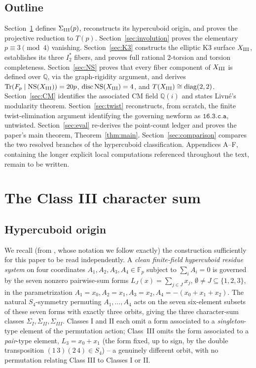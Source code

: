 \documentclass[11pt]{amsart}
\theoremstyle{definition}
\newcommand{\Fp}{\mathbb{F}_p}
\newcommand{\Q}{\mathbb{Q}}
\newcommand{\NS}{\mathrm{NS}}
\DeclareMathOperator{\Tr}{Tr}
\DeclareMathOperator{\disc}{disc}
\begin{document}
\subsection*{Outline}
Section~\ref{sec:sum} defines $\Sigma_{\rm III}(p)$, reconstructs its
hypercuboid origin, and proves the projective reduction to $T(p)$.
Section~\ref{sec:involution} proves the elementary $p\equiv3\pmod4$
vanishing. Section~\ref{sec:K3} constructs the elliptic K3 surface
$X_{\rm III}$, establishes its three $I_2^*$ fibers, and proves full
rational $2$-torsion and torsion completeness. Section~\ref{sec:NS}
proves that every fiber component of $X_{\rm III}$ is defined over $\Q$,
via the graph-rigidity argument, and derives $\Tr(F_p\mid\NS(X_{\rm
III}))=20p$, $\disc\NS(X_{\rm III})=4$, and $T(X_{\rm
III})\cong\mathrm{diag}(2,2)$. Section~\ref{sec:CM} identifies the
associated CM field $\Q(i)$ and states Livn\'e's modularity theorem.
Section~\ref{sec:twist} reconstructs, from scratch, the finite
twist-elimination argument identifying the governing newform as
$\texttt{16.3.c.a}$, untwisted. Section~\ref{sec:eval} re-derives the
point-count ledger and proves the paper's main theorem,
Theorem~\ref{thm:main}. Section~\ref{sec:comparison} compares the two
resolved branches of the hypercuboid classification. Appendices A--F,
containing the longer explicit local computations referenced throughout
the text, remain to be written.

\section{The Class III character sum}
\label{sec:sum}

\subsection{Hypercuboid origin}
We recall (from \cite{ClassesI_II}, whose notation we follow exactly) the
construction sufficiently for this paper to be read independently. A
\emph{clean finite-field hypercuboid residue system} on four coordinates
$A_1,A_2,A_3,A_4\in\Fp$ subject to $\sum_iA_i=0$ is governed by the seven
nonzero pairwise-sum forms $L_J(x)=\sum_{j\in J}x_j$, $\emptyset\neq
J\subseteq\{1,2,3\}$, in the parametrization $A_1=x_0,A_2=x_1,A_3=x_2,
A_4=-(x_0+x_1+x_2)$. The natural $S_4$-symmetry permuting $A_1,\dots,A_4$
acts on the seven six-element subsets of these seven forms with exactly
three orbits, giving the three character-sum classes $\Sigma_I,\Sigma_{II},
\Sigma_{III}$. Classes I and II each omit a form associated to a
\emph{singleton}-type element of the permutation action; Class~III omits
the form associated to a \emph{pair}-type element, $L_3=x_0+x_1$ (the
form fixed, up to sign, by the double transposition $(1\,3)(2\,4)\in
S_4$) -- a genuinely different orbit, with no permutation relating Class
III to Classes I or II.
\end{document}
